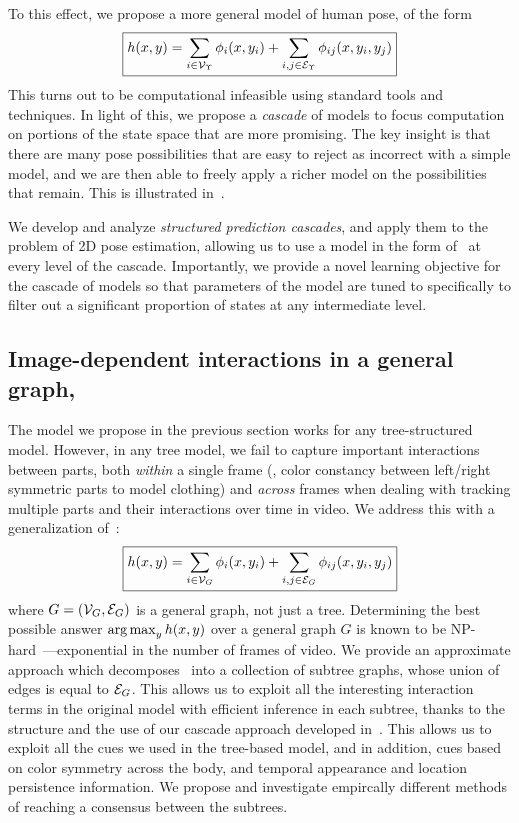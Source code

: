 To this effect, we propose a more general model of human pose, of the form 
\begin{equation}
\boxed{h(x,y) =  \sum_{i \in \mathcal{V}_{\Upsilon}} \phi_i(x,y_i) + \sum_{i,j \in 
\mathcal{E}_{\Upsilon}} \phi_{ij}(x,y_i,y_j)}
\label{eq:contrib1}
\end{equation}
This turns out to be computational infeasible using standard tools and techniques.  In light of this, we propose a {\em cascade} of models to focus computation on portions of the state space that are more promising.  The key insight is that there are many pose possibilities that are easy to reject as incorrect with a simple model, and we are then able to freely apply a richer model on the possibilities that remain.  This is illustrated in~.

We develop and analyze {\em structured prediction cascades}, and apply them to 
the problem of 2D pose estimation, allowing us to use a model in the form 
of~ at every level of the cascade.  Importantly, we provide a 
novel learning objective for the cascade of models so that parameters of the 
model are tuned to specifically to filter out a significant proportion of 
states at any intermediate level. 

\subsection{Image-dependent interactions in a general 
graph,~}
The model we propose in the previous section works for any tree-structured 
model.  However, in any tree model, we fail to capture important interactions 
between parts, both {\em within} a single frame (\eg, color constancy between 
left/right symmetric parts to model clothing) and {\em across} frames when 
dealing with tracking multiple parts and their interactions over time in video.  
We address this with a generalization of~:
\begin{equation}
\boxed{h(x,y) =  \sum_{i \in \mathcal{V}_{G}} \phi_i(x,y_i) + \sum_{i,j \in \mathcal{E}_{G}} 
\phi_{ij}(x,y_i,y_j)}
\label{eq:contrib2}
\end{equation}
where $G = (\mathcal{V}_G,\mathcal{E}_G)$ is a general graph, not just a tree.  Determining the 
best possible answer $\mathop{\arg\max}_y h(x,y)$ over a general graph $G$ is known to be 
NP-hard~\citep{koller-book}---exponential in the number of frames of video.  We 
provide an approximate approach which decomposes~ into a 
collection of subtree graphs, whose union of edges is equal to $\mathcal{E}_G$.  This 
allows us to exploit all the interesting interaction terms in the original 
model with efficient inference in each subtree, thanks to the structure and the 
use of our cascade approach developed in~.  This allows us to 
exploit all the cues we used in the tree-based model, and in addition, cues 
based on color symmetry across the body, and temporal appearance and location 
persistence information.  We propose and investigate empircally different 
methods of reaching a consensus between the subtrees.

